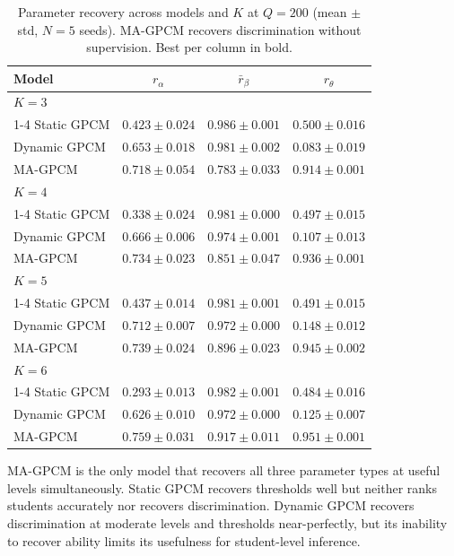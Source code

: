 \documentclass[pdflatex,sn-apa]{sn-jnl}
\begin{document}
\begin{table}[htb!]
\centering
\caption{Parameter recovery across models and $K$ at $Q=200$ (mean $\pm$ std, $N\!=\!5$ seeds). MA-GPCM recovers discrimination without supervision. Best per column in bold.}
\label{tab:irt_recovery_k}
\setlength{\tabcolsep}{3pt}
\begin{tabular}{lccc}
\toprule
\textbf{Model} & $r_\alpha$ & $\bar{r}_\beta$ & $r_\theta$ \\
\midrule
\multicolumn{4}{l}{$K=3$} \\
\cmidrule(lr){1-4}
Static GPCM  & $0.423 \pm 0.024$ & $\mathbf{0.986} \pm 0.001$ & $0.500 \pm 0.016$ \\
Dynamic GPCM & $0.653 \pm 0.018$ & $0.981 \pm 0.002$ & $0.083 \pm 0.019$ \\
MA-GPCM    & $\mathbf{0.718} \pm 0.054$ & $0.783 \pm 0.033$ & $\mathbf{0.914} \pm 0.001$ \\
\midrule
\multicolumn{4}{l}{$K=4$} \\
\cmidrule(lr){1-4}
Static GPCM  & $0.338 \pm 0.024$ & $\mathbf{0.981} \pm 0.000$ & $0.497 \pm 0.015$ \\
Dynamic GPCM & $0.666 \pm 0.006$ & $0.974 \pm 0.001$ & $0.107 \pm 0.013$ \\
MA-GPCM    & $\mathbf{0.734} \pm 0.023$ & $0.851 \pm 0.047$ & $\mathbf{0.936} \pm 0.001$ \\
\midrule
\multicolumn{4}{l}{$K=5$} \\
\cmidrule(lr){1-4}
Static GPCM  & $0.437 \pm 0.014$ & $\mathbf{0.981} \pm 0.001$ & $0.491 \pm 0.015$ \\
Dynamic GPCM & $0.712 \pm 0.007$ & $0.972 \pm 0.000$ & $0.148 \pm 0.012$ \\
MA-GPCM    & $\mathbf{0.739} \pm 0.024$ & $0.896 \pm 0.023$ & $\mathbf{0.945} \pm 0.002$ \\
\midrule
\multicolumn{4}{l}{$K=6$} \\
\cmidrule(lr){1-4}
Static GPCM  & $0.293 \pm 0.013$ & $\mathbf{0.982} \pm 0.001$ & $0.484 \pm 0.016$ \\
Dynamic GPCM & $0.626 \pm 0.010$ & $0.972 \pm 0.000$ & $0.125 \pm 0.007$ \\
MA-GPCM    & $\mathbf{0.759} \pm 0.031$ & $0.917 \pm 0.011$ & $\mathbf{0.951} \pm 0.001$ \\
\bottomrule
\end{tabular}
\end{table}

MA-GPCM is the only model that recovers all three parameter types at useful levels simultaneously. Static GPCM recovers thresholds well but neither ranks students accurately nor recovers discrimination. Dynamic GPCM recovers discrimination at moderate levels and thresholds near-perfectly, but its inability to recover ability limits its usefulness for student-level inference.
\end{document}
